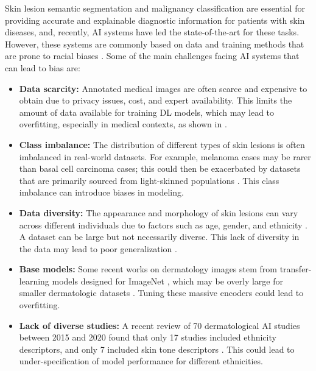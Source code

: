 \documentclass[11pt]{ucthesis}
\begin{document}
Skin lesion semantic segmentation and malignancy classification are essential for providing accurate and explainable diagnostic information for patients with skin diseases, and, recently, AI systems have led the state-of-the-art for these tasks. However, these systems are commonly based on data and training methods that are prone to racial biases \cite{daneshjou_2022_disparities,owens_2020_those,chen_2021_ethical}. Some of the main challenges facing AI systems that can lead to bias are:
\begin{itemize}
  \item \textbf{Data scarcity:} Annotated medical images are often scarce and expensive to obtain due to privacy issues, cost, and expert availability. This limits the amount of data available for training DL models, which may lead to overfitting, especially in medical contexts, as shown in \cite{razzak_2017_deep}.
  \item \textbf{Class imbalance:} The distribution of different types of skin lesions is often imbalanced in real-world datasets. For example, melanoma cases may be rarer than basal cell carcinoma cases; this could then be exacerbated by datasets that are primarily sourced from light-skinned populations \cite{groh_2021_evaluating}. This class imbalance can introduce biases in modeling.
  \item \textbf{Data diversity:} The appearance and morphology of skin lesions can vary across different individuals due to factors such as age, gender, and ethnicity \cite{adelekun_2020_skin}. A dataset can be large but not necessarily diverse. This lack of diversity in the data may lead to poor generalization \cite{daneshjou_2022_disparities}.
  \item \textbf{Base models:} Some recent works on dermatology images stem from transfer-learning models designed for ImageNet \cite{deng_2009_imagenet}, which may be overly large for smaller dermatologic datasets \cite{esteva_2017_dermatologistlevel,han_2020_augmented}. Tuning these massive encoders could lead to overfitting.
  \item \textbf{Lack of diverse studies:} A recent review of 70 dermatological AI studies between 2015 and 2020 found that only 17 studies included ethnicity descriptors, and only 7 included skin tone descriptors \cite{daneshjou_2021_lack}. This could lead to under-specification of model performance for different ethnicities.
\end{itemize}
\end{document}

